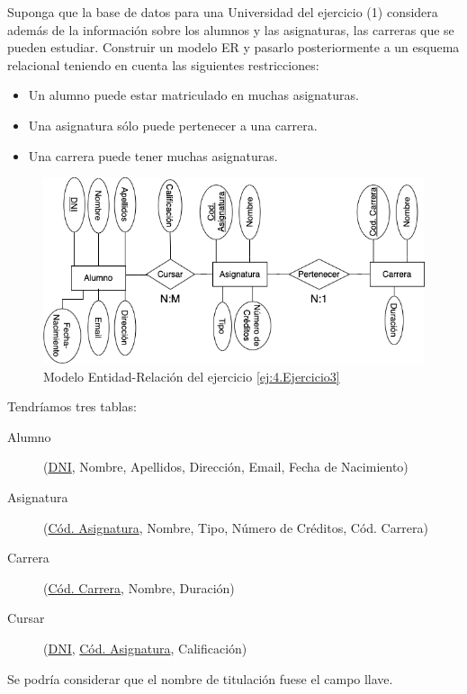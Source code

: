 \newpage
\begin{ejercicio}\label{ej:4.Ejercicio3}
Suponga que la base de datos para una Universidad del ejercicio (1) considera además de la información sobre los alumnos y las asignaturas, las carreras que se pueden estudiar. Construir un modelo ER y pasarlo posteriormente a un esquema relacional teniendo en cuenta las siguientes restricciones:
\begin{itemize}
    \item Un alumno puede estar matriculado en muchas asignaturas.
    \item Una asignatura sólo puede pertenecer a una carrera.
    \item Una carrera puede tener muchas asignaturas.
\end{itemize}

    \begin{figure}[H]
        \centering
        \includegraphics[width=0.8\linewidth]{Imagenes/Ejercicio 3.png}
        \caption{Modelo Entidad-Relación del ejercicio \ref{ej:4.Ejercicio3}}
        \label{fig:Ej3}
    \end{figure}


    Tendríamos tres tablas:
    \begin{description}
        \item [Alumno] (\underline{DNI}, Nombre, Apellidos, Dirección, Email, Fecha de Nacimiento)

        \item [Asignatura] (\underline{Cód. Asignatura}, Nombre, Tipo, Número de Créditos, Cód. Carrera)

        \item [Carrera] (\underline{Cód. Carrera}, Nombre, Duración)

        \item [Cursar] (\underline{DNI}, \underline{Cód. Asignatura}, Calificación)
    \end{description}

    \begin{observacion}
        Se podría considerar que el nombre de titulación fuese el campo llave.
    \end{observacion}
    
\end{ejercicio}


